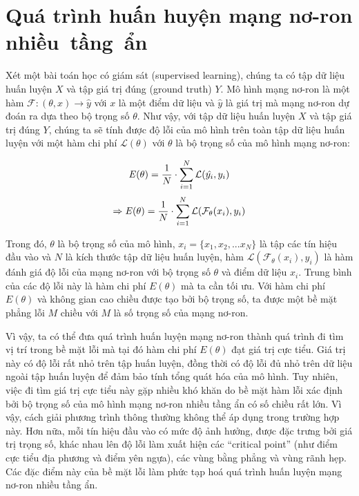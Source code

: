 \section{Quá trình huấn huyện mạng nơ-ron\\nhiều~tầng~ẩn}

Xét một bài toán học có giám sát (supervised learning), chúng ta có tập dữ liệu huấn luyện $X$ và tập giá trị đúng (ground truth) $Y$. Mô hình mạng nơ-ron là một hàm $\mathcal{F}: (\theta, x) \rightarrow \hat{y}$ với $x$ là một điểm dữ liệu và $\hat{y}$ là giá trị mà mạng nơ-ron dự đoán ra dựa theo bộ trọng số $\theta$. Như vậy, với tập dữ liệu huấn luyện $X$ và tập giá trị đúng $Y$, chúng ta sẽ tính được độ lỗi của mô hình trên toàn tập dữ liệu huấn luyện với một hàm chi phí $\mathcal{L}(\theta)$ với $\theta$ là bộ trọng số của mô hình mạng nơ-ron:

\begin{equation}
	\label{eqn:E-y}
	\mathbf{\it{E}(\theta)} = \frac{1}{N}\cdot \sum_{i=1}^{N}\mathcal{L}(\hat{y_i}, y_i)
\end{equation}
\begin{equation}
	\label{eqn:E-Fx}
	\Rightarrow \mathbf{\it{E}(\theta)} = \frac{1}{N}\cdot \sum_{i=1}^{N}\mathcal{L}(\mathcal{F}_\theta( x_i), y_i)
\end{equation}

Trong đó, $\theta$ là bộ trọng số của mô hình, $x_i = \{x_1, x_2,...x_N\}$ là tập các tín hiệu đầu vào và $N$ là kích thước tập dữ liệu huấn luyện, hàm $\mathcal{L}(\mathcal{F}_\theta( x_i), y_i)$ là hàm đánh giá độ lỗi của mạng nơ-ron với bộ trọng số $\theta$ và điểm dữ liệu $x_i$. Trung bình của các độ lỗi này là hàm chi phí $E(\theta)$ mà ta cần tối ưu. Với hàm chi phí $E(\theta)$ và không gian cao chiều được tạo bởi bộ trọng số, ta được một bề mặt phẳng lỗi $M$ chiều với $M$ là số trọng số của mạng nơ-ron.

Vì vậy, ta có thể đưa quá trình huấn luyện mạng nơ-ron thành quá trình đi tìm vị trí trong bề mặt lỗi mà tại đó hàm chi phí $E(\theta)$ đạt giá trị cực tiểu. Giá trị này có độ lỗi rất nhỏ trên tập huấn luyện, đồng thời có độ lỗi đủ nhỏ trên dữ liệu ngoài tập huấn luyện để đảm bảo tính tổng quát hóa của mô hình. Tuy nhiên, việc đi tìm giá trị cực tiểu này gặp nhiều khó khăn do bề mặt hàm lỗi xác định bởi bộ trọng số của mô hình mạng nơ-ron nhiều tầng ẩn có số chiều rất lớn. Vì vậy, cách giải phương trình thông thường không thể áp dụng trong trường hợp này. Hơn nữa, mỗi tín hiệu đầu vào có mức độ ảnh hưởng, được đặc trưng bởi giá trị trọng số, khác nhau lên độ lỗi làm xuất hiện các ``critical point'' (như điểm cực tiểu địa phương và điểm yên ngựa), các vùng bằng phẳng và vùng rãnh hẹp. Các đặc điểm này của bề mặt lỗi làm phức tạp hoá quá trình huấn luyện mạng nơ-ron nhiều tầng ẩn.

